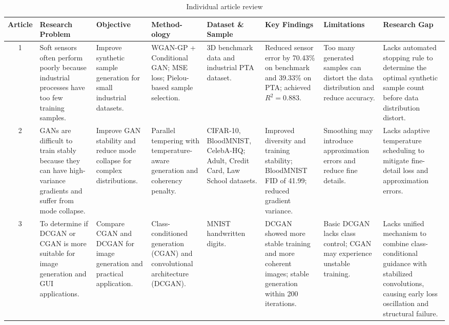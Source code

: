 \documentclass[12pt,a4paper]{article}
\begin{document}
\begin{table}[H]

\caption{Individual article review}
\label{tab:individual-article-review}

\fontsize{10pt}{12pt}\selectfont

\begin{tabular}{|c|p{1.7cm}|p{2cm}|p{1.8cm}|p{1.5cm}|p{1.5cm}|p{2cm}|p{2cm}|}
\hline

\centering\textbf{Article} &
\centering\textbf{Research Problem} &
\centering\textbf{Objective} &
\centering\textbf{Method-ology} &
\centering\textbf{Dataset \& Sample} &
\centering\textbf{Key Findings} &
\centering\textbf{Limitations} &
\centering\textbf{Research Gap}
\tabularnewline
\hline

1 &  
Soft sensors often perform poorly because industrial processes have too few training samples. & 
Improve synthetic sample generation for small industrial datasets.&
WGAN-GP + Conditional GAN; MSE loss; Pielou-based sample selection.&
3D benchmark data and industrial PTA dataset.&
Reduced sensor error by 70.43\% on benchmark and 39.33\% on PTA; achieved $R^2=0.883$.&
Too many generated samples can distort the data distribution and reduce accuracy.& Lacks automated stopping rule to determine the optimal synthetic sample count before data distribution distort.
\tabularnewline
\hline

2 &
GANs are difficult to train stably because they can have high-variance gradients and suffer from mode collapse. &  
Improve GAN stability and reduce mode collapse for complex distributions.&
Parallel tempering with temperature-aware generation and coherency penalty.&
CIFAR-10, BloodMNIST, CelebA-HQ; Adult, Credit Card, Law School datasets.&
Improved diversity and training stability; BloodMNIST FID of 41.99; reduced gradient variance.&
Smoothing may introduce approximation errors and reduce fine details.& Lacks adaptive temperature scheduling to mitigate fine-detail loss and approximation errors.
\tabularnewline
\hline

3 &
To determine if DCGAN or CGAN is more suitable for image generation and GUI applications. &
Compare CGAN and DCGAN for image generation and practical application. &
Class-conditioned generation (CGAN) and convolutional architecture (DCGAN).&
MNIST handwritten digits.&
DCGAN showed more stable training and more coherent images; stable generation within 200 iterations.& 
Basic DCGAN lacks class control; CGAN may experience unstable training.& Lacks unified mechanism to combine class-conditional guidance with stabilized convolutions, causing early loss oscillation and structural failure.
\tabularnewline
\hline

\end{tabular}

\end{table}
\end{document}

